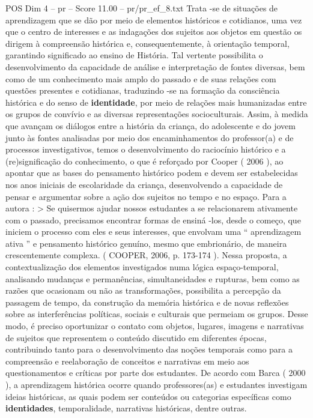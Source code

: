 \begin{textsample}{POS Dim 4 – pr – Score 11.00 – pr/pr\_ef\_8.txt}
Trata -se de situações de aprendizagem que se dão por meio de elementos históricos e cotidianos, uma vez que o centro de interesses e as indagações dos sujeitos aos objetos em questão os dirigem à compreensão histórica e, consequentemente, à orientação temporal, garantindo significado ao ensino de História.
Tal vertente possibilita o desenvolvimento da capacidade de análise e interpretação de fontes diversas, bem como de um conhecimento mais amplo do passado e de suas relações com questões presentes e cotidianas, traduzindo -se na formação da consciência histórica e do senso de \textbf{identidade}, por meio de relações mais humanizadas entre os grupos de convívio e as diversas representações socioculturais.
Assim, à medida que avançam os diálogos entre a história da criança, do adolescente e do jovem junto às fontes analisadas por meio dos encaminhamentos do professor(a) e de processos investigativos, temos o desenvolvimento do raciocínio histórico e a (re)significação do conhecimento, o que é reforçado por Cooper ( 2006 ), ao apontar que as bases do pensamento histórico podem e devem ser estabelecidas nos anos iniciais de escolaridade da criança, desenvolvendo a capacidade de pensar e argumentar sobre a ação dos sujeitos no tempo e no espaço.
Para a autora : > Se quisermos ajudar nossos estudantes a se relacionarem ativamente com o passado, precisamos encontrar formas de ensiná -los, desde o começo, que iniciem o processo com eles e seus interesses, que envolvam uma “ aprendizagem ativa ” e pensamento histórico genuíno, mesmo que embrionário, de maneira crescentemente complexa. ( COOPER, 2006, p. 173-174 ).
Nessa proposta, a contextualização dos elementos investigados numa lógica espaço-temporal, analisando mudanças e permanências, simultaneidades e rupturas, bem como as razões que ocasionam ou não as transformações, possibilita a percepção da passagem de tempo, da construção da memória histórica e de novas reflexões sobre as interferências políticas, sociais e culturais que permeiam os grupos.
Desse modo, é preciso oportunizar o contato com objetos, lugares, imagens e narrativas de sujeitos que representem o conteúdo discutido em diferentes épocas, contribuindo tanto para o desenvolvimento das noções temporais como para a compreensão e reelaboração de conceitos e narrativas em meio aos questionamentos e críticas por parte dos estudantes.
De acordo com Barca ( 2000 ), a aprendizagem histórica ocorre quando professores(as) e estudantes investigam ideias históricas, as quais podem ser conteúdos ou categorias específicas como \textbf{identidades}, temporalidade, narrativas históricas, dentre outras.

\end{textsample}
